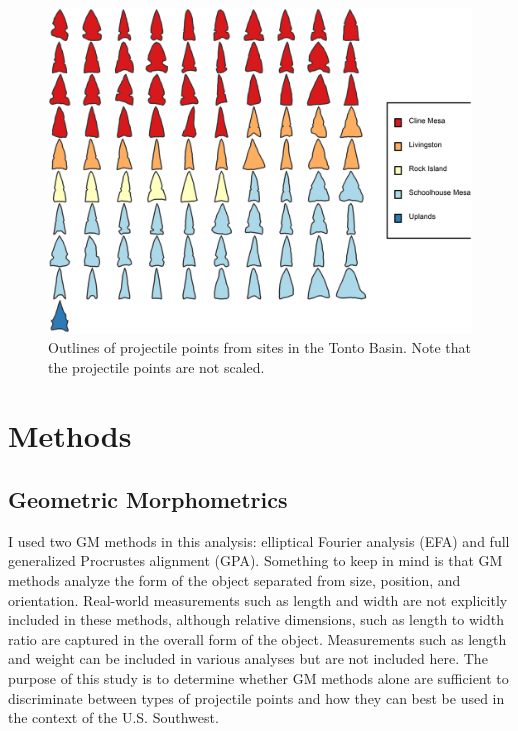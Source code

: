 \documentclass[a4paper]{article}
\providecommand{\DIFadd}[1]{{\protect\color{blue}\uwave{#1}}} %
\providecommand{\DIFaddbegin}{} %
\providecommand{\DIFaddend}{} %
\begin{document}
\begin{figure}
\includegraphics[width=1\linewidth]{figures/TontoPointsFinal} \caption{Outlines of projectile points from sites in the Tonto Basin. Note that the projectile points are not scaled.}\label{fig:TontoPointsFinal}
\end{figure}

\DIFaddbegin \hypertarget{methods}{%
\section*{Methods}\label{methods}}
\addcontentsline{toc}{section}{\DIFadd{Methods}}

\DIFaddend \hypertarget{geometric-morphometrics}{%
\subsection*{Geometric Morphometrics}\label{geometric-morphometrics}}

I used two GM methods in this analysis: elliptical Fourier analysis (EFA) and full generalized Procrustes alignment (GPA). Something to keep in mind is that GM methods analyze the form of the object separated from size, position, and orientation. Real-world measurements such as length and width are not explicitly included in these methods, although relative dimensions, such as length to width ratio are captured in the overall form of the object. Measurements such as length and weight can be included in various analyses but are not included here. The purpose of this study is to determine whether GM methods alone are sufficient to discriminate between types of projectile points and how they can best be used in the context of the U.S. Southwest.
\end{document}
